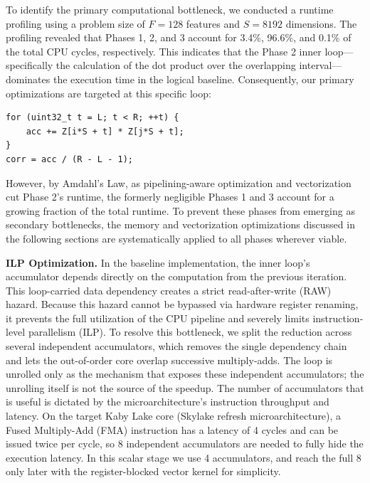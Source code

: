 \documentclass[letterpaper]{article}
\newcommand{\mypar}[1]{{\bf #1.}}
\begin{document}
To identify the primary computational bottleneck, we conducted a runtime profiling using a problem size of $F = 128$ features and $S = 8192$ dimensions.
The profiling revealed that Phases 1, 2, and 3 account for 3.4\%, 96.6\%, and 0.1\% of the total CPU cycles, respectively.
This indicates that the Phase 2 inner loop—specifically the calculation of the dot product over the overlapping interval—dominates the execution time in the logical baseline.
Consequently, our primary optimizations are targeted at this specific loop:

{\fontsize{8}{10}\selectfont
\begin{Verbatim}
for (uint32_t t = L; t < R; ++t) {
    acc += Z[i*S + t] * Z[j*S + t];
}
corr = acc / (R - L - 1);
\end{Verbatim}
}

However, by Amdahl's Law, as pipelining-aware optimization and vectorization cut Phase 2's runtime, the formerly negligible Phases 1 and 3 account for a growing fraction of the total runtime.
To prevent these phases from emerging as secondary bottlenecks, the memory and vectorization optimizations discussed in the following sections are systematically applied to all phases wherever viable.

\mypar{ILP Optimization}
In the baseline implementation, the inner loop's accumulator depends directly on the computation from the previous iteration.
This loop-carried data dependency creates a strict read-after-write (RAW) hazard.
Because this hazard cannot be bypassed via hardware register renaming, it prevents the full utilization of the CPU pipeline and severely limits instruction-level parallelism (ILP).
To resolve this bottleneck, we split the reduction across several independent accumulators, which removes the single dependency chain and lets the out-of-order core overlap successive multiply-adds.
The loop is unrolled only as the mechanism that exposes these independent accumulators; the unrolling itself is not the source of the speedup.
The number of accumulators that is useful is dictated by the microarchitecture's instruction throughput and latency.
On the target Kaby Lake core (Skylake refresh microarchitecture), a Fused Multiply-Add (FMA) instruction has a latency of 4 cycles and can be issued twice per cycle, so 8 independent accumulators are needed to fully hide the execution latency.
In this scalar stage we use 4 accumulators, and reach the full 8 only later with the register-blocked vector kernel for simplicity.
\end{document}
